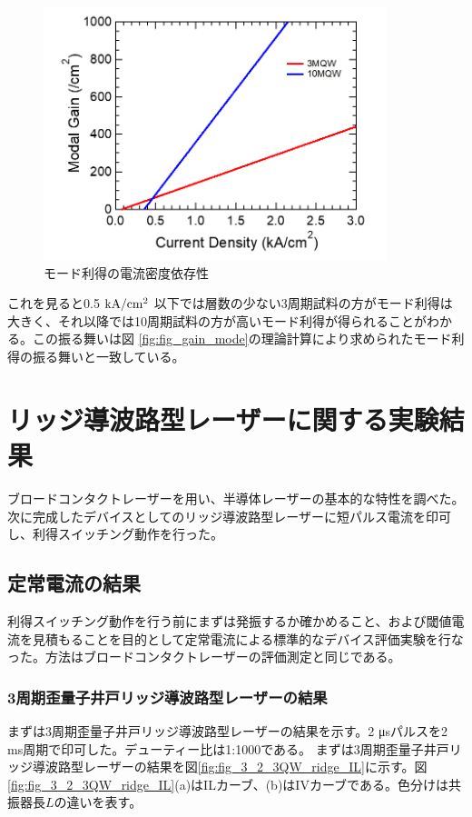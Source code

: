 {\begin{figure}[t]
	\centering
	\includegraphics[width=10cm]{figure/fig_3_1_broadcontact_modal_gain.png}
	\caption{モード利得の電流密度依存性}
	\label{fig:fig_3_1_broadcontact_modal_gain}
\end{figure}
これを見ると0.5$ \ \rm{kA/cm^2}$ 以下では層数の少ない3周期試料の方がモード利得は大きく、それ以降では10周期試料の方が高いモード利得が得られることがわかる。この振る舞いは図	\ref{fig:fig_gain_mode}の理論計算により求められたモード利得の振る舞いと一致している。
\clearpage
\section{リッジ導波路型レーザーに関する実験結果}%
ブロードコンタクトレーザーを用い、半導体レーザーの基本的な特性を調べた。次に完成したデバイスとしてのリッジ導波路型レーザーに短パルス電流を印可し、利得スイッチング動作を行った。
\subsection{定常電流の結果}

利得スイッチング動作を行う前にまずは発振するか確かめること、および閾値電流を見積もることを目的として定常電流による標準的なデバイス評価実験を行なった。方法はブロードコンタクトレーザーの評価測定と同じである。
\subsubsection{3周期歪量子井戸リッジ導波路型レーザーの結果}
まずは3周期歪量子井戸リッジ導波路型レーザーの結果を示す。2 \si{\micro s}パルスを2 ms周期で印可した。デューティー比は1:1000である。
まずは3周期歪量子井戸リッジ導波路型レーザーの結果を図\ref{fig:fig_3_2_3QW_ridge_IL}に示す。図\ref{fig:fig_3_2_3QW_ridge_IL}(a)はILカーブ、(b)はIVカーブである。色分けは共振器長$L$の違いを表す。

}
